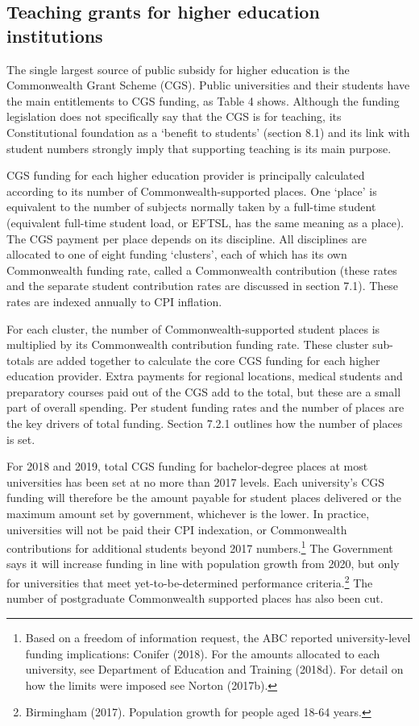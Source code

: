 \documentclass[]{book}
\begin{document}
\hypertarget{teaching-grants-for-higher-education-institutions}{%
\subsection{Teaching grants for higher education institutions}\label{teaching-grants-for-higher-education-institutions}}

The single largest source of public subsidy for higher education is the Commonwealth Grant Scheme (CGS). Public universities and their students have the main entitlements to CGS funding, as Table 4 shows. Although the funding legislation does not specifically say that the CGS is for teaching, its Constitutional foundation as a `benefit to students' (section 8.1) and its link with student numbers strongly imply that supporting teaching is its main purpose.

CGS funding for each higher education provider is principally calculated according to its number of Commonwealth-supported places. One `place' is equivalent to the number of subjects normally taken by a full-time student (equivalent full-time student load, or EFTSL, has the same meaning as a place). The CGS payment per place depends on its discipline. All disciplines are allocated to one of eight funding `clusters', each of which has its own Commonwealth funding rate, called a Commonwealth contribution (these rates and the separate student contribution rates are discussed in section 7.1). These rates are indexed annually to CPI inflation.

For each cluster, the number of Commonwealth-supported student places is multiplied by its Commonwealth contribution funding rate. These cluster sub-totals are added together to calculate the core CGS funding for each higher education provider. Extra payments for regional locations, medical students and preparatory courses paid out of the CGS add to the total, but these are a small part of overall spending. Per student funding rates and the number of places are the key drivers of total funding. Section 7.2.1 outlines how the number of places is set.

For 2018 and 2019, total CGS funding for bachelor-degree places at most universities has been set at no more than 2017 levels. Each university's CGS funding will therefore be the amount payable for student places delivered or the maximum amount set by government, whichever is the lower. In practice, universities will not be paid their CPI indexation, or Commonwealth contributions for additional students beyond 2017 numbers.\footnote{Based on a freedom of information request, the ABC reported university-level funding implications: Conifer (2018). For the amounts allocated to each university, see Department of Education and Training (2018d). For detail on how the limits were imposed see Norton (2017b).} The Government says it will increase funding in line with population growth from 2020, but only for universities that meet yet-to-be-determined performance criteria.\footnote{Birmingham (2017). Population growth for people aged 18-64 years.} The number of postgraduate Commonwealth supported places has also been cut.
\end{document}
